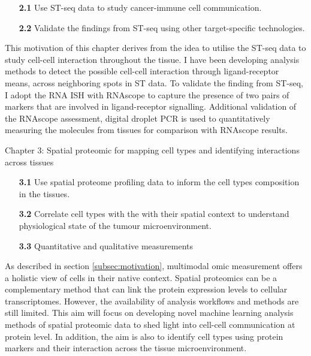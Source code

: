 \begin{enumerate}[align=left]
    \item[\textbf{2.1}] Use ST-seq data to study cancer-immune cell communication.
    \item[\textbf{2.2}] Validate the findings from ST-seq using other target-specific technologies.
\end{enumerate}
This motivation of this chapter derives from the idea to utilise the ST-seq data to study cell-cell interaction throughout the tissue. I have been developing analysis methods to detect the possible cell-cell interaction through ligand-receptor means, across neighboring spots in ST data. To validate the finding from ST-seq, I adopt the RNA ISH with RNAscope to capture the presence of two pairs of markers that are involved in ligand-receptor signalling. Additional validation of the RNAscope assessment, digital droplet PCR is used to quantitatively measuring the molecules from tissues for comparison with RNAscope results.      

Chapter 3: Spatial proteomic for mapping cell types and identifying interactions across tissues
\begin{enumerate}[align=left]
    \item[\textbf{3.1}] Use spatial proteome profiling data to inform the cell types composition in the tissues.
    \item[\textbf{3.2}] Correlate cell types with the with their spatial context to understand physiological state of the tumour microenvironment.
    \item[\textbf{3.3}] Quantitative and qualitative measurements
\end{enumerate}
As described in section \ref{subsec:motivation}, multimodal omic measurement offers a holistic view of cells in their native context. Spatial proteomics can be a complementary method that can link the protein expression levels to cellular transcriptomes. However, the availability of analysis workflows and methods are still limited. This aim will focus on developing novel machine learning analysis methods of spatial proteomic data to shed light into cell-cell communication at protein level. In addition, the aim is also to identify cell types using protein markers and their interaction across the tissue microenvironment.             

